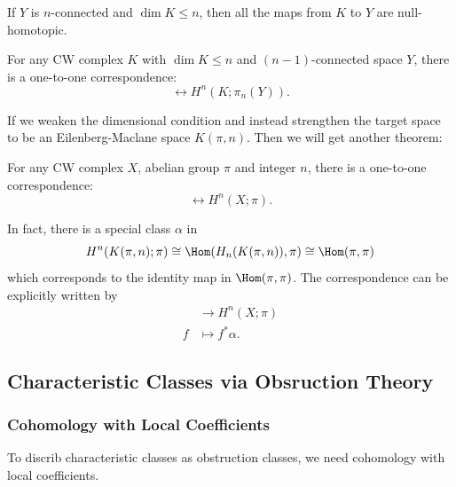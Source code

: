 \begin{corollary}
    If $Y$ is $n$-connected and $\dim K\leq n$, then all the maps from $K$ 
    to $Y$ are null-homotopic.
\end{corollary}

\begin{theorem}
    For any CW complex $K$ with $\dim K\leq n$ and $(n-1)$-connected space $Y$, 
    there is a one-to-one correspondence:
    \begin{equation*}
        [K,Y]\longleftrightarrow H^n(K;\pi_n(Y)).
    \end{equation*}
\end{theorem}
If we weaken the dimensional condition and instead strengthen the target space 
to be an Eilenberg-Maclane space $K(\pi,n)$. Then we will get another theorem: 
\begin{theorem}
    For any CW complex $X$, abelian group $\pi$ and integer $n$, there is a 
    one-to-one correspondence: 
    \begin{equation*}
        [X,K(\pi,n)]\longleftrightarrow H^n(X;\pi).
    \end{equation*}
\end{theorem}
\begin{remark}
    In fact, there is a special class $\alpha$ in 
    \begin{equation*}
        H^n(K(\pi,n);\pi)\cong \Hom(H_n(K(\pi,n)),\pi)\cong \Hom(\pi,\pi)
    \end{equation*}
    which corresponds to the identity map in $\Hom(\pi,\pi)$. The correspondence 
    can be explicitly written by 
    \begin{align*}
        [X,K(\pi,n)]&\to H^n(X;\pi) \\
        f&\mapsto f^*\alpha.
    \end{align*}
\end{remark}

\subsection{Characteristic Classes via Obsruction Theory}
\subsubsection{Cohomology with Local Coefficients}
To discrib characteristic classes as obstruction classes, we need cohomology 
with local coefficients. 

